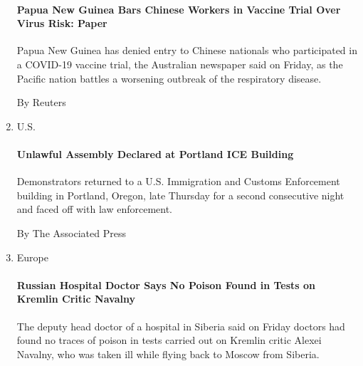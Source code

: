 \begin{enumerate}
  \href{/reuters/2020/08/21/world/asia/21reuters-health-coronavirus-papua.html?searchResultPosition=6}{}

  \hypertarget{papua-new-guinea-bars-chinese-workers-in-vaccine-trial-over-virus-risk-paper}{%
  \paragraph{Papua New Guinea Bars Chinese Workers in Vaccine Trial Over
  Virus Risk:
  Paper}\label{papua-new-guinea-bars-chinese-workers-in-vaccine-trial-over-virus-risk-paper}}

  Papua New Guinea has denied entry to Chinese nationals who
  participated in a COVID-19 vaccine trial, the Australian newspaper
  said on Friday, as the Pacific nation battles a worsening outbreak of
  the respiratory disease.

  By Reuters
\item
  U.S.

  \href{/aponline/2020/08/21/us/ap-us-portland-protests.html?searchResultPosition=7}{}

  \hypertarget{unlawful-assembly-declared-at-portland-ice-building}{%
  \paragraph{Unlawful Assembly Declared at Portland ICE
  Building}\label{unlawful-assembly-declared-at-portland-ice-building}}

  Demonstrators returned to a U.S. Immigration and Customs Enforcement
  building in Portland, Oregon, late Thursday for a second consecutive
  night and faced off with law enforcement.

  By The Associated Press
\item
  Europe

  \href{/reuters/2020/08/21/world/europe/21reuters-russia-politics-navalny-poison.html?searchResultPosition=8}{}

  \hypertarget{russian-hospital-doctor-says-no-poison-found-in-tests-on-kremlin-critic-navalny}{%
  \paragraph{Russian Hospital Doctor Says No Poison Found in Tests on
  Kremlin Critic
  Navalny}\label{russian-hospital-doctor-says-no-poison-found-in-tests-on-kremlin-critic-navalny}}

  The deputy head doctor of a hospital in Siberia said on Friday doctors
  had found no traces of poison in tests carried out on Kremlin critic
  Alexei Navalny, who was taken ill while flying back to Moscow from
  Siberia.


\end{enumerate}

